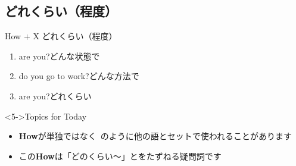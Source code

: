 \documentclass[aspectratio=169,xcolor={dvipsnames,table}]{beamer}
\begin{document}
\subsection{ どれくらい（程度）}
\begin{frame}[plain]{How $+$ X どれくらい（程度）}
 \begin{enumerate}
  \item<1->  are you?\hfill{\scriptsize どんな状態で}
  \item<2->  do you go to work?\hfill{\scriptsize どんな方法で}
  \item<3->  are you?\hfill{\scriptsize どれくらい}\\
\hfill{}
 \end{enumerate}

\bigskip

\begin{block}<5->{Topics for Today}
 \begin{itemize}[square]\small
  \item {\bfseries How}が単独ではなく\,\,\,のように他の語とセットで使われることがあります
  \item この{\bfseries How}は「どのくらい～」とをたずねる疑問詞です
\end{itemize}
\end{block}
\end{frame}
\end{document}
